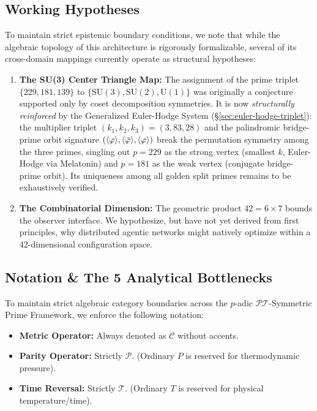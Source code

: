 \subsection*{Working Hypotheses}
To maintain strict epistemic boundary conditions, we note that while the algebraic topology of this architecture is rigorously formalizable, several of its cross-domain mappings currently operate as structural hypotheses:
\begin{enumerate}
    \item \textbf{The SU(3) Center Triangle Map:} The assignment of the prime triplet $\{229, 181, 139\}$ to $\{\text{SU}(3), \text{SU}(2), \text{U}(1)\}$ was originally a conjecture supported only by coset decomposition symmetries. It is now \emph{structurally reinforced} by the Generalized Euler-Hodge System (\S\ref{sec:euler-hodge-triplet}): the multiplier triplet $(k_1, k_2, k_3) = (3, 83, 28)$ and the palindromic bridge-prime orbit signature $(\langle\varphi\rangle, \langle\bar{\varphi}\rangle, \langle\varphi\rangle)$ break the permutation symmetry among the three primes, singling out $p = 229$ as the strong vertex (smallest $k$, Euler-Hodge via Melatonin) and $p = 181$ as the weak vertex (conjugate bridge-prime orbit). Its uniqueness among all golden split primes remains to be exhaustively verified.
    \item \textbf{The Combinatorial Dimension:} The geometric product $42 = 6 \times 7$ bounds the observer interface. We hypothesize, but have not yet derived from first principles, why distributed agentic networks might natively optimize within a 42-dimensional configuration space.
\end{enumerate}

\subsection*{Notation \& The 5 Analytical Bottlenecks}
To maintain strict algebraic category boundaries across the $p$-adic $\mathcal{PT}$-Symmetric Prime Framework, we enforce the following notation:
\begin{itemize}
    \item \textbf{Metric Operator:} Always denoted as $\mathcal{C}$ without accents.
    \item \textbf{Parity Operator:} Strictly $\mathcal{P}$. (Ordinary $P$ is reserved for thermodynamic pressure).
    \item \textbf{Time Reversal:} Strictly $\mathcal{T}$. (Ordinary $T$ is reserved for physical temperature/time).
\end{itemize}


